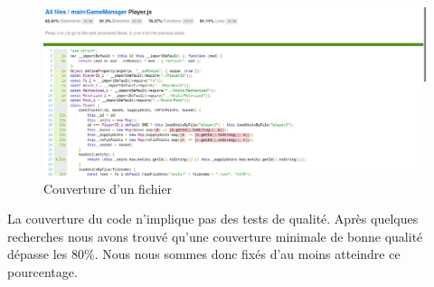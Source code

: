 \begin{figure}[H]
    \centering
    \includegraphics[scale=0.3]{data/couverture_test_2.png}
    \caption{Couverture d'un fichier}
\end{figure}

La couverture du code n'implique pas des tests de qualité. Après quelques recherches nous avons trouvé qu'une couverture minimale de bonne qualité dépasse les 80\%. Nous nous sommes donc fixés d'au moins atteindre ce pourcentage.